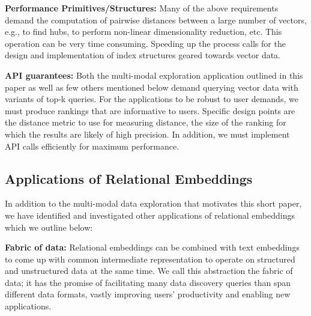 \noindent\textbf{Performance Primitives/Structures: }Many of the above
requirements demand the computation of pairwise distances between a large number
of vectors, e.g., to find hubs, to perform non-linear dimensionality reduction,
etc. This operation can be very time consuming. Speeding up the process calls
for the design and implementation of index structures geared towards vector
data.

\noindent\textbf{API guarantees: }Both the multi-modal exploration application
outlined in this paper as well as few others mentioned below demand querying
vector data with variants of top-k queries. For the applications to be robust to
user demands, we must produce rankings that are informative to users. Specific
design points are the distance metric to use for measuring distance, the size of
the ranking for which the results are likely of high precision. In addition, we
must implement API calls efficiently for maximum performance.



\subsection*{Applications of Relational Embeddings}

In addition to the multi-modal data exploration that motivates this short paper,
we have identified and investigated other applications of relational embeddings
which we outline below:

\noindent\textbf{Fabric of data: } Relational embeddings can be combined with
text embeddings to come up with common intermediate representation to operate on
structured and unstructured data at the same time. We call this abstraction the
fabric of data; it has the promise of facilitating many data discovery queries
than span different data formats, vastly improving users' productivity and
enabling new applications.

